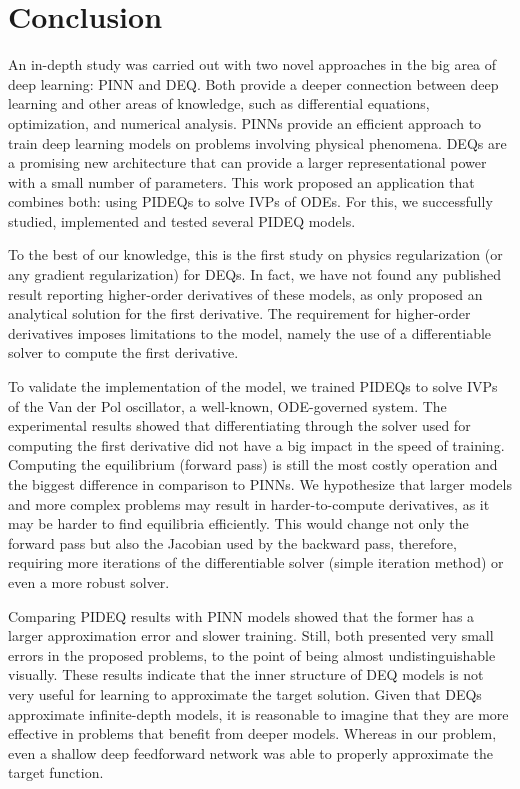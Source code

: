 \chapter{Conclusion}\label{ch:conclusion}

An in-depth study was carried out with two novel approaches in the big area of deep learning: \gls{PINN} and {DEQ}.
Both provide a deeper connection between deep learning and other areas of knowledge, such as differential equations, optimization, and numerical analysis.
\gls{PINN}s provide an efficient approach to train deep learning models on problems involving physical phenomena.
\gls{DEQ}s are a promising new architecture that can provide a larger representational power with a small number of parameters.
This work proposed an application that combines both: using \gls{PIDEQ}s to solve \gls{IVP}s of \gls{ODE}s.
For this, we successfully studied, implemented and tested several \gls{PIDEQ} models.

To the best of our knowledge, this is the first study on physics regularization (or any gradient regularization) for \gls{DEQ}s.
In fact, we have not found any published result reporting higher-order derivatives of these models, as \textcite{Bai2019} only proposed an analytical solution for the first derivative.
The requirement for higher-order derivatives imposes limitations to the model, namely the use of a differentiable solver to compute the first derivative.

To validate the implementation of the model, we trained \gls{PIDEQ}s to solve \gls{IVP}s of the Van der Pol oscillator, a well-known, \gls{ODE}-governed system.
The experimental results showed that differentiating through the solver used for computing the first derivative did not have a big impact in the speed of training.
Computing the equilibrium (forward pass) is still the most costly operation and the biggest difference in comparison to \gls{PINN}s.
We hypothesize that larger models and more complex problems may result in harder-to-compute derivatives, as it may be harder to find equilibria efficiently.
This would change not only the forward pass but also the Jacobian used by the backward pass, therefore, requiring more iterations of the differentiable solver (simple iteration method) or even a more robust solver.

Comparing \gls{PIDEQ} results with \gls{PINN} models showed that the former has a larger approximation error and slower training.
Still, both presented very small errors in the proposed problems, to the point of being almost undistinguishable visually.
These results indicate that the inner structure of \gls{DEQ} models is not very useful for learning to approximate the target solution.
Given that \gls{DEQ}s approximate infinite-depth models, it is reasonable to imagine that they are more effective in problems that benefit from deeper models.
Whereas in our problem, even a shallow deep feedforward network was able to properly approximate the target function.

